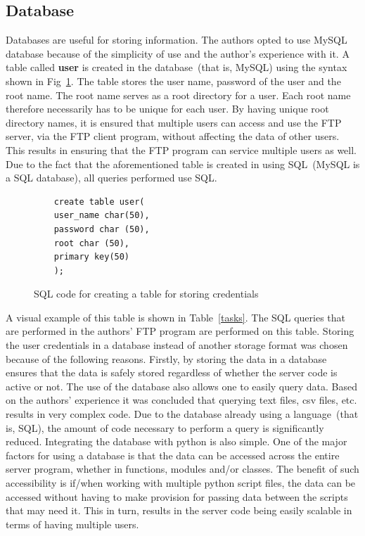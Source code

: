 \documentclass[journal, a4paper]{IEEEtran}
\begin{document}
\subsection{Database}

Databases are useful for storing information. The authors opted to use MySQL database because of the simplicity of use and the author's experience with it. A table called \textbf{user} is created in the database~(that is, MySQL) using the syntax shown in Fig~\ref{sqltable}. The table stores the user name, password of the user and the root name. The root name serves as a root directory for a user. Each root name therefore necessarily has to be unique for each user. By having unique root directory names, it is ensured that multiple users can access and use the FTP server, via the FTP client program, without affecting the data of other users. This results in ensuring that the FTP program can service multiple users as well. Due to the fact that the aforementioned table is created in using SQL~(MySQL is a SQL database), all queries performed use SQL.

\begin{figure}[hbtp]
	\begin{lstlisting}
	create table user(
	user_name char(50),
	password char (50),
	root char (50),
	primary key(50)
	);
	\end{lstlisting}
	\caption{SQL code for creating a table for storing credentials}
	\label {sqltable}
\end{figure}

A visual example of this table is shown in Table~\ref{tasks}. The SQL queries that are performed in the authors' FTP  program are performed on this table. Storing the user credentials in a database instead of another storage format was chosen because of the following reasons. Firstly, by storing the data in a database ensures that the data is safely stored regardless of whether the server code is active or not. The use of the database also allows one to easily query data. Based on the authors' experience it was concluded that querying text files, csv files, etc. results in very complex code. Due to the database already using a language~(that is, SQL), the amount of code necessary to perform a query is significantly reduced. Integrating the database with python is also simple. One of the major factors for using a database is that the data can be accessed across the entire server program, whether in functions, modules and/or classes. The benefit of such accessibility is if/when working with multiple python script files, the data can be accessed without having to make provision for passing data between the scripts that may need it. This in turn, results in the server code being easily scalable in terms of having multiple users.
\end{document}
